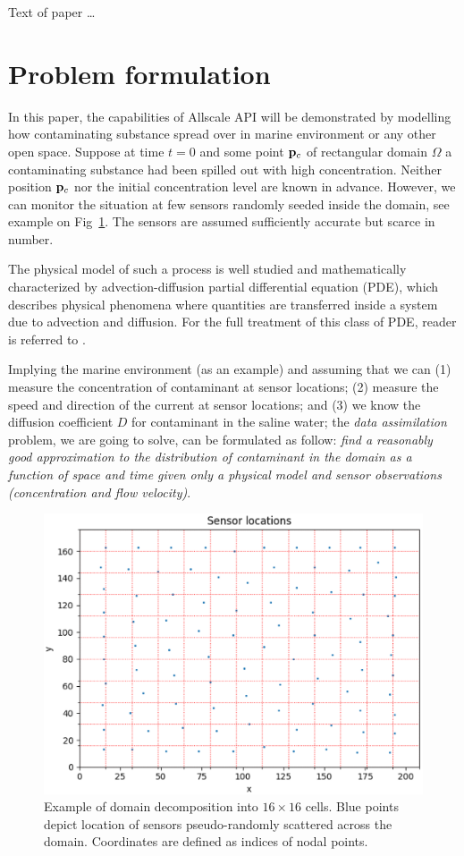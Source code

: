 \documentclass[acmsmall,review,anonymous]{acmart}\settopmatter{printfolios=true,printccs=false,printacmref=false}
\begin{document}
Text of paper \ldots

\section{Problem formulation}

In this paper, the capabilities of Allscale API will be demonstrated by modelling how contaminating substance spread over in marine environment or any other open space. Suppose at time $t=0$ and some point ${\bf p}_c$ of rectangular domain $\Omega$ a contaminating substance had been spilled out with high concentration. Neither position ${\bf p}_c$ nor the initial concentration level are known in advance. However, we can monitor the situation at few sensors randomly seeded inside the domain, see example on Fig~\ref{fig:sensors}. The sensors are assumed sufficiently accurate but scarce in number.

The physical model of such a process is well studied and mathematically characterized by advection-diffusion partial differential equation (PDE), which describes physical phenomena where quantities are transferred inside a system due to advection and diffusion. For the full treatment of this class of PDE, reader is referred to \cite{Hundsdorfer03}.

Implying the marine environment (as an example) and assuming that we can (1) measure the concentration of contaminant at sensor locations; (2) measure the speed and direction of the current at sensor locations; and (3) we know the diffusion coefficient $D$ for contaminant in the saline water; the \textit{data assimilation} problem, we are going to solve, can be formulated as follow: \textit{find a reasonably good approximation to the distribution of contaminant in the domain as a function of space and time given only a physical model and sensor observations (concentration and flow velocity)}.

\begin{figure}
\includegraphics[scale=0.5]{images/sensors-Nx208-Ny176}
\caption{Example of domain decomposition into ${16{\times}16}$ cells. Blue points depict location of sensors pseudo-randomly scattered across the domain. Coordinates are defined as indices of nodal points.}
\label{fig:sensors}
\end{figure}
\end{document}

